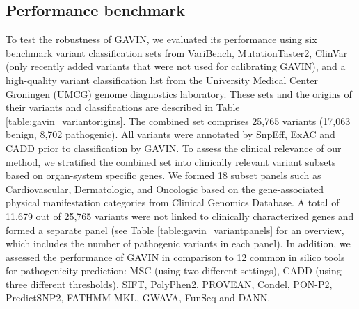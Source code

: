 \subsection{Performance benchmark}
To test the robustness of GAVIN, we evaluated its performance using six benchmark variant classification sets from VariBench\cite{Nair_2012}, Mu\-ta\-tion\-Tas\-ter2\cite{Schwarz_2014}, ClinVar (only recently added variants that were not used for calibrating GAVIN), and a high-quality variant classification list from the University Medical Center Groningen (UMCG) genome diagnostics laboratory.
These sets and the origins of their variants and classifications are described in Table \ref{table:gavin_variantorigins}.
The combined set comprises 25,765 variants (17,063 benign, 8,702 pathogenic).
All variants were annotated by SnpEff, ExAC and CADD prior to classification by GAVIN.
To assess the clinical relevance of our method, we stratified the combined set into clinically relevant variant subsets based on organ-system specific genes.
We formed 18 subset panels such as Cardiovascular, Dermatologic, and Oncologic based on the gene-associated physical manifestation categories from Clinical Genomics Database\cite{Solomon_2013}.
A total of 11,679 out of 25,765 variants were not linked to clinically characterized genes and formed a separate panel (see Table \ref{table:gavin_variantpanels} for an overview, which includes the number of pathogenic variants in each panel).
In addition, we assessed the performance of GAVIN in comparison to 12 common in silico tools for pathogenicity prediction: MSC (using two different settings), CADD (using three different thresholds), SIFT\cite{Kumar_2009}, PolyPhen2\cite{Adzhubei_2010}, PROVEAN\cite{Choi_2012}, Condel\cite{Gonz_lez_P_rez_2011}, PON-P2\cite{Niroula_2015}, PredictSNP2\cite{Bendl_2016}, FATHMM-MKL\cite{Shihab_2015}, GWAVA\cite{Ritchie_2014}, FunSeq\cite{Fu_2014} and DANN\cite{Quang_2014}.

